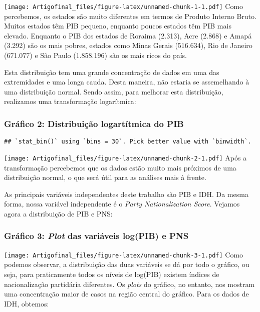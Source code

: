 \documentclass[]{article}
\begin{document}
\texttt{[image: Artigofinal\_files/figure-latex/unnamed-chunk-1-1.pdf]}
Como percebemos, os estados são muito diferentes em termos de Produto
Interno Bruto. Muitos estados têm PIB pequeno, enquanto poucos estados
têm PIB mais elevado. Enquanto o PIB dos estados de Roraima (2.313),
Acre (2.868) e Amapá (3.292) são os mais pobres, estados como Minas
Gerais (516.634), Rio de Janeiro (671.077) e São Paulo (1.858.196) são
os mais ricos do país.

Esta distribuição tem uma grande concentração de dados em uma das
extremidades e uma longa cauda. Desta maneira, não estaria se
assemelhando à uma distribuição normal. Sendo assim, para melhorar esta
distribuição, realizamos uma transformação logarítmica:

\newpage

\subsubsection{Gráfico 2: Distribuição logartítmica do
PIB}\label{grafico-2-distribuicao-logartitmica-do-pib}

\begin{verbatim}
## `stat_bin()` using `bins = 30`. Pick better value with `binwidth`.
\end{verbatim}

\texttt{[image: Artigofinal\_files/figure-latex/unnamed-chunk-2-1.pdf]}
Após a transformação percebemos que os dados estão muito mais próximos
de uma distribuição normal, o que será útil para as análises mais à
frente.

As principais variáveis independentes deste trabalho são PIB e IDH. Da
mesma forma, nossa variável independente é o \emph{Party Nationalization
Score}. Vejamos agora a distribuição de PIB e PNS:

\subsubsection{\texorpdfstring{Gráfico 3: \emph{Plot} das variáveis
log(PIB) e
PNS}{Gráfico 3: Plot das variáveis log(PIB) e PNS}}\label{grafico-3-plot-das-variaveis-logpib-e-pns}

\texttt{[image: Artigofinal\_files/figure-latex/unnamed-chunk-3-1.pdf]}
Como podemos observar, a distribuição das duas variáveis se dá por todo
o gráfico, ou seja, para praticamente todos os níveis de log(PIB)
existem índices de nacionalização partidária diferentes. Os \emph{plots}
do gráfico, no entanto, nos mostram uma concentração maior de casos na
região central do gráfico. Para os dados de IDH, obtemos:
\end{document}
